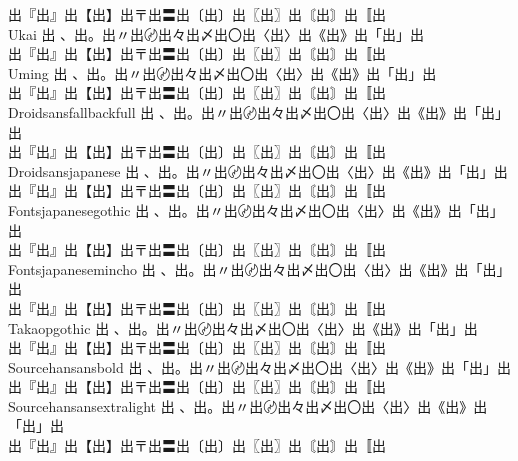 \begin{tabbing}
\> {\mktsFontfileIpamp{}出『出』出【出】出〒出〓出〔出〕出〖出〗出〘出〙出〚出} \\
Ukai \> {\mktsFontfileUkai{}出 、出。出〃出〄出々出〆出〇出〈出〉出《出》出「出」出}\\
\> {\mktsFontfileUkai{}出『出』出【出】出〒出〓出〔出〕出〖出〗出〘出〙出〚出} \\
Uming \> {\mktsFontfileUming{}出 、出。出〃出〄出々出〆出〇出〈出〉出《出》出「出」出}\\
\> {\mktsFontfileUming{}出『出』出【出】出〒出〓出〔出〕出〖出〗出〘出〙出〚出} \\
Droidsansfallbackfull \> {\mktsFontfileDroidsansfallbackfull{}出 、出。出〃出〄出々出〆出〇出〈出〉出《出》出「出」出}\\
\> {\mktsFontfileDroidsansfallbackfull{}出『出』出【出】出〒出〓出〔出〕出〖出〗出〘出〙出〚出} \\
Droidsansjapanese \> {\mktsFontfileDroidsansjapanese{}出 、出。出〃出〄出々出〆出〇出〈出〉出《出》出「出」出}\\
\> {\mktsFontfileDroidsansjapanese{}出『出』出【出】出〒出〓出〔出〕出〖出〗出〘出〙出〚出} \\
Fontsjapanesegothic \> {\mktsFontfileFontsjapanesegothic{}出 、出。出〃出〄出々出〆出〇出〈出〉出《出》出「出」出}\\
\> {\mktsFontfileFontsjapanesegothic{}出『出』出【出】出〒出〓出〔出〕出〖出〗出〘出〙出〚出} \\
Fontsjapanesemincho \> {\mktsFontfileFontsjapanesemincho{}出 、出。出〃出〄出々出〆出〇出〈出〉出《出》出「出」出}\\
\> {\mktsFontfileFontsjapanesemincho{}出『出』出【出】出〒出〓出〔出〕出〖出〗出〘出〙出〚出} \\
Takaopgothic \> {\mktsFontfileTakaopgothic{}出 、出。出〃出〄出々出〆出〇出〈出〉出《出》出「出」出}\\
\> {\mktsFontfileTakaopgothic{}出『出』出【出】出〒出〓出〔出〕出〖出〗出〘出〙出〚出} \\
Sourcehansansbold \> {\mktsFontfileSourcehansansbold{}出 、出。出〃出〄出々出〆出〇出〈出〉出《出》出「出」出}\\
\> {\mktsFontfileSourcehansansbold{}出『出』出【出】出〒出〓出〔出〕出〖出〗出〘出〙出〚出} \\
Sourcehansansextralight \> {\mktsFontfileSourcehansansextralight{}出 、出。出〃出〄出々出〆出〇出〈出〉出《出》出「出」出}\\
\> {\mktsFontfileSourcehansansextralight{}出『出』出【出】出〒出〓出〔出〕出〖出〗出〘出〙出〚出} \\

\end{tabbing}

